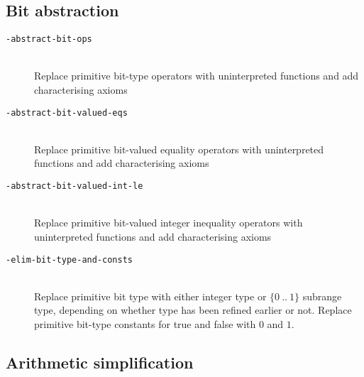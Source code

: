 \documentclass[12pt,fleqn]{article}
\newcommand{\subrange}[2]{\{{#1}\:..\:{#2}\}}
\newcommand{\optionb}[1]{\item[\texttt{-{#1}}]\ \\}
\begin{document}
\subsection{Bit abstraction}

\begin{description}
\optionb{abstract-bit-ops}
  Replace primitive bit-type operators with uninterpreted functions 
  and add characterising axioms

\optionb{abstract-bit-valued-eqs}
  Replace primitive bit-valued equality operators with uninterpreted functions 
  and add characterising axioms

\optionb{abstract-bit-valued-int-le}
  Replace primitive bit-valued integer inequality operators with
  uninterpreted functions and add characterising axioms

\optionb{elim-bit-type-and-consts}
  Replace primitive bit type with either integer type or $\subrange{0}{1}$ 
  subrange type, depending on whether type has been refined earlier or not.
  Replace primitive bit-type constants for true and false with $0$ and $1$.

\end{description}


\subsection{Arithmetic simplification}
\end{document}

